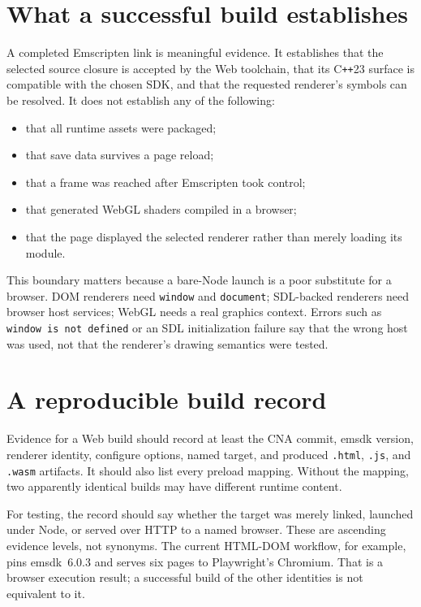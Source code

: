 \section{What a successful build establishes}

A completed Emscripten link is meaningful evidence.  It establishes that the selected source
closure is accepted by the Web toolchain, that its C\texttt{++}23 surface is compatible with
the chosen SDK, and that the requested renderer's symbols can be resolved.  It does not
establish any of the following:

\begin{itemize}
  \item that all runtime assets were packaged;
  \item that save data survives a page reload;
  \item that a frame was reached after Emscripten took control;
  \item that generated WebGL shaders compiled in a browser;
  \item that the page displayed the selected renderer rather than merely loading its module.
\end{itemize}

This boundary matters because a bare-Node launch is a poor substitute for a browser.  DOM
renderers need \texttt{window} and \texttt{document}; SDL-backed renderers need browser host
services; WebGL needs a real graphics context.  Errors such as \texttt{window is not defined}
or an SDL initialization failure say that the wrong host was used, not that the renderer's
drawing semantics were tested.

\section{A reproducible build record}

Evidence for a Web build should record at least the CNA commit, emsdk version, renderer
identity, configure options, named target, and produced \texttt{.html}, \texttt{.js}, and
\texttt{.wasm} artifacts.  It should also list every preload mapping.  Without the mapping,
two apparently identical builds may have different runtime content.

For testing, the record should say whether the target was merely linked, launched under Node,
or served over HTTP to a named browser.  These are ascending evidence levels, not synonyms.
The current HTML-DOM workflow, for example, pins emsdk~6.0.3 and serves six pages to Playwright's
Chromium.  That is a browser execution result; a successful build of the other identities is
not equivalent to it.

